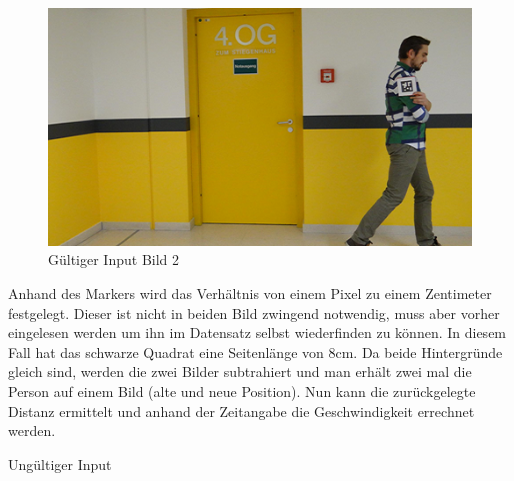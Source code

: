 \documentclass[deutsch]{scrartcl}
\begin{document}
\begin{figure}[H]
	\centering
	\includegraphics{testimg2.png}
	\caption{Gültiger Input Bild 2}
	\label{fig2}
\end{figure}


Anhand des Markers wird das Verhältnis von einem Pixel zu einem Zentimeter festgelegt.
Dieser ist nicht in beiden Bild zwingend notwendig, muss aber vorher eingelesen werden um ihn im Datensatz selbst wiederfinden zu können. In diesem Fall hat das schwarze Quadrat eine Seitenlänge von 8cm.
Da beide Hintergründe gleich sind, werden die zwei Bilder subtrahiert und man erhält zwei mal die Person auf einem Bild (alte und neue Position). Nun kann die zurückgelegte Distanz ermittelt und anhand der Zeitangabe die Geschwindigkeit errechnet werden.

Ungültiger Input
\end{document}
